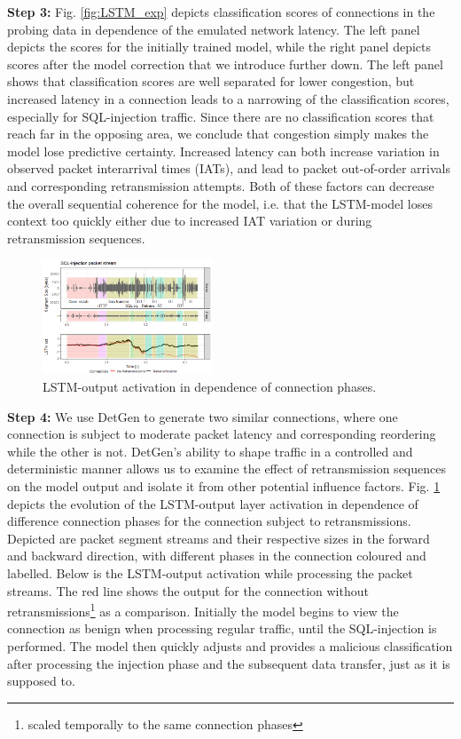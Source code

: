 \documentclass[conference]{IEEEtran}
\begin{document}
\textbf{Step 3:} Fig. \ref{fig:LSTM_exp} depicts classification scores of connections in the probing data in dependence of the emulated network latency. The left panel depicts the scores for the initially trained model, while the right panel depicts scores after the model correction that we introduce further down. 
The left panel shows that classification scores are well separated for lower congestion, but increased latency in a connection leads to a narrowing of the classification scores, especially for SQL-injection traffic. Since there are no classification scores that reach far in the opposing area, we conclude that congestion simply makes the model lose predictive certainty. 
Increased latency can both increase variation in observed packet interarrival times (IATs), and lead to packet out-of-order arrivals and corresponding retransmission attempts. Both of these factors can decrease the overall sequential coherence for the model, i.e. that the LSTM-model loses context too quickly either due to increased IAT variation or during retransmission sequences. 


\begin{figure}
\centering
\includegraphics[width=0.45\textwidth]{images/LSTM_activation_new.png}
\caption{LSTM-output activation in dependence of connection phases.}\label{fig:LSTM_act}
\end{figure}

\textbf{Step 4:} We use DetGen to generate two similar connections, where one connection is subject to moderate packet latency and corresponding reordering while the other is not. DetGen's ability to shape traffic in a controlled and deterministic manner allows us to examine the effect of retransmission sequences on the model output and isolate it from other potential influence factors. 
Fig. \ref{fig:LSTM_act} depicts the evolution of the LSTM-output layer activation in dependence of difference connection phases for the connection subject to retransmissions. Depicted are packet segment streams and their respective sizes in the forward and backward direction, with different phases in the connection coloured and labelled. Below is the LSTM-output activation while processing the packet streams. The red line shows the output for the connection without retransmissions\footnote{scaled temporally to the same connection phases} as a comparison.
Initially the model begins to view the connection as benign when processing regular traffic, until the SQL-injection is performed. The model then quickly adjusts and provides a malicious classification after processing the injection phase and the subsequent data transfer, just as it is supposed to. 
\end{document}
